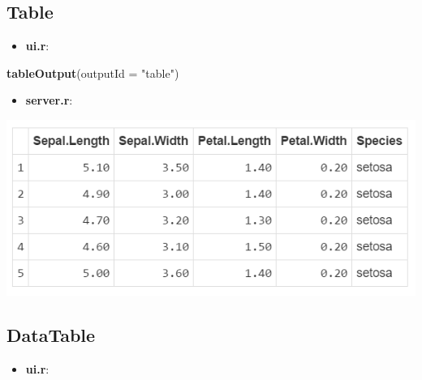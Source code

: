 \documentclass[
]{article}
\newenvironment{Shaded}{\begin{snugshade}}{\end{snugshade}}
\newcommand{\AttributeTok}[1]{\textcolor[rgb]{0.13,0.29,0.53}{#1}}
\newcommand{\FunctionTok}[1]{\textcolor[rgb]{0.13,0.29,0.53}{\textbf{#1}}}
\newcommand{\NormalTok}[1]{#1}
\newcommand{\OtherTok}[1]{\textcolor[rgb]{0.56,0.35,0.01}{#1}}
\newcommand{\SpecialCharTok}[1]{\textcolor[rgb]{0.81,0.36,0.00}{\textbf{#1}}}
\newcommand{\StringTok}[1]{\textcolor[rgb]{0.31,0.60,0.02}{#1}}
\providecommand{\tightlist}{%
  \setlength{\itemsep}{0pt}\setlength{\parskip}{0pt}}
\begin{document}
\hypertarget{table}{%
\subsection{Table}\label{table}}

\begin{itemize}
\tightlist
\item
  \textbf{ui.r}:
\end{itemize}

\begin{Shaded}
\begin{Highlighting}[]
\FunctionTok{tableOutput}\NormalTok{(}\AttributeTok{outputId =} \StringTok{"table"}\NormalTok{)}
\end{Highlighting}
\end{Shaded}

\begin{itemize}
\tightlist
\item
  \textbf{server.r}:
\end{itemize}

\begin{Shaded}
\end{Shaded}

\includegraphics{img/otable.png}

\hypertarget{datatable}{%
\subsection{DataTable}\label{datatable}}

\begin{itemize}
\tightlist
\item
  \textbf{ui.r}:
\end{itemize}
\end{document}
